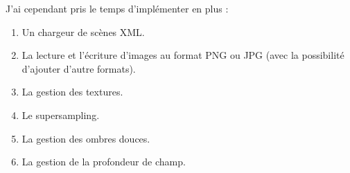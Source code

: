 J'ai cependant pris le temps d'implémenter en plus :
\begin{enumerate}
  \item Un chargeur de scènes XML.
  \item La lecture et l'écriture d'images au format PNG ou JPG (avec la
    possibilité d'ajouter d'autre formats).
  \item La gestion des textures.
  \item Le \gls{supersampling}.
  \item La gestion des ombres douces.
  \item La gestion de la profondeur de champ.
\end{enumerate}

